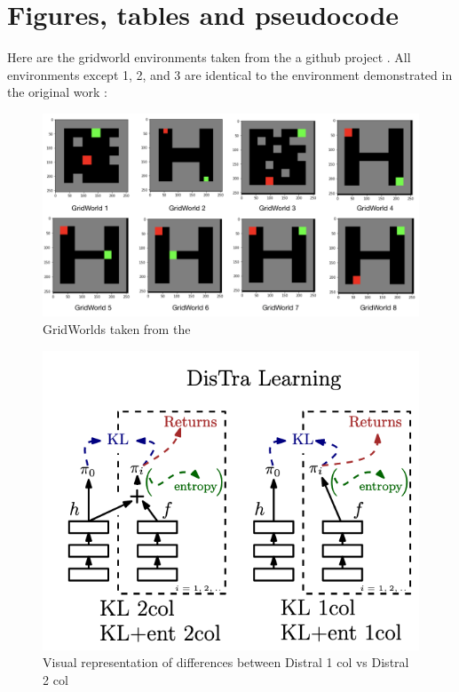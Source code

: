 \documentclass[12pt]{report}
\begin{document}


\appendix




\chapter{Figures, tables and pseudocode}

Here are the gridworld environments taken from the a github project \cite{alfredo_github}. All environments except 1, 2, and 3 are identical to the environment demonstrated in the original work \cite{teh2017distral}:
\begin{figure}[H]
    \center
    \includegraphics[width=0.7\linewidth]{figs/GridWorlds.png}
    \caption{GridWorlds taken from the \cite{alfredo_github}}
    \label{fig:gridworlds}
\end{figure}
\begin{figure}[H]
    \center
    \includegraphics[width=0.45\linewidth]{figs/distral1_2_diagram.png}
    \caption{Visual representation of differences between Distral 1 col vs Distral 2 col}
    \label{fig:distral12}
\end{figure}
\end{document}
